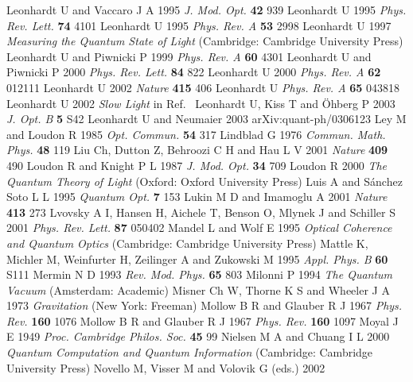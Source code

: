 \documentclass[12pt,amsmath,amssymb]{article}
\numberwithin{equation}{section}
\begin{document}
\begin{thebibliography}{999}
Leonhardt U and Vaccaro J A 1995 {\it J. Mod. Opt.} {\bf 42} 939
Leonhardt U 1995 {\it Phys. Rev. Lett.} {\bf 74} 4101
Leonhardt U 1995 {\it Phys. Rev. A} {\bf 53} 2998
Leonhardt U 1997 {\it Measuring the Quantum State of Light}
(Cambridge: Cambridge University Press)
Leonhardt U and Piwnicki P 1999
{\it Phys. Rev. A} {\bf 60} 4301
Leonhardt U and Piwnicki P 2000
{\it Phys. Rev. Lett.} {\bf 84} 822
Leonhardt U 2000
{\it Phys. Rev. A} {\bf 62} 012111
Leonhardt U 2002
{\it Nature} {\bf 415} 406
Leonhardt U
{\it Phys. Rev. A} {\bf 65} 043818
Leonhardt U 2002
{\it Slow Light}
in Ref.\ \cite{Novello}
Leonhardt U, Kiss T and \"Ohberg P 2003
{\it J. Opt. B} {\bf 5} S42
Leonhardt U and Neumaier 2003 
arXiv:quant-ph/0306123
Ley M and Loudon R 1985
{\it Opt. Commun.} {\bf 54} 317
Lindblad G 1976
{\it Commun. Math. Phys.} {\bf 48} 119
Liu Ch, Dutton Z, Behroozi C H and Hau L V 2001
{\it Nature} {\bf 409} 490
Loudon R and Knight P L 1987 {\it J. Mod. Opt.} {\bf 34} 709
Loudon R 2000 {\it The Quantum Theory of Light} (Oxford: Oxford
University Press)
Luis A and S\'{a}nchez Soto L L 1995
{\it Quantum Opt.} {\bf 7} 153
Lukin M D and Imamoglu A 2001
{\it Nature} {\bf 413} 273
Lvovsky A I, Hansen H, Aichele T, Benson O, Mlynek J
and Schiller S 2001
{\it Phys. Rev. Lett.} {\bf 87} 050402
Mandel L and Wolf E 1995
{\it Optical Coherence and Quantum Optics}
(Cambridge: Cambridge University Press)
Mattle K, Michler M, Weinfurter H, Zeilinger A and Zukowski M 1995
{\it Appl. Phys. B} {\bf 60} S111
Mermin N D 1993
{\it Rev. Mod. Phys.} {\bf 65} 803
Milonni P 1994
{\it The Quantum Vacuum}
(Amsterdam: Academic)
Misner Ch W, Thorne K S and Wheeler J A 1973
{\it Gravitation}
(New York: Freeman)
Mollow B R and Glauber R J 1967
{\it Phys. Rev.} {\bf 160} 1076
Mollow B R and Glauber R J 1967
{\it Phys. Rev.} {\bf 160} 1097
Moyal J E 1949
{\it Proc. Cambridge Philos. Soc.} {\bf 45} 99
Nielsen M A and Chuang I L 2000
{\it Quantum Computation and Quantum Information}
(Cambridge: Cambridge University Press)
Novello M, Visser M and Volovik G (eds.) 2002

\end{thebibliography}
\end{document}
